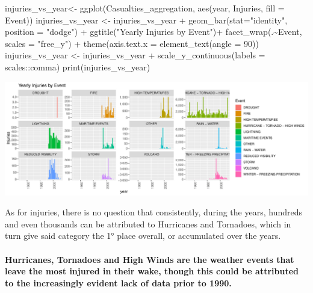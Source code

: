 \documentclass[
]{article}
\newenvironment{Shaded}{\begin{snugshade}}{\end{snugshade}}
\newcommand{\AttributeTok}[1]{\textcolor[rgb]{0.77,0.63,0.00}{#1}}
\newcommand{\DecValTok}[1]{\textcolor[rgb]{0.00,0.00,0.81}{#1}}
\newcommand{\FunctionTok}[1]{\textcolor[rgb]{0.00,0.00,0.00}{#1}}
\newcommand{\NormalTok}[1]{#1}
\newcommand{\OtherTok}[1]{\textcolor[rgb]{0.56,0.35,0.01}{#1}}
\newcommand{\SpecialCharTok}[1]{\textcolor[rgb]{0.00,0.00,0.00}{#1}}
\newcommand{\StringTok}[1]{\textcolor[rgb]{0.31,0.60,0.02}{#1}}
\begin{document}
\begin{Shaded}
\begin{Highlighting}[]
\NormalTok{injuries\_vs\_year}\OtherTok{\textless{}{-}} \FunctionTok{ggplot}\NormalTok{(Casualties\_aggregation, }\FunctionTok{aes}\NormalTok{(year, Injuries, }\AttributeTok{fill =}\NormalTok{ Event))}
\NormalTok{injuries\_vs\_year }\OtherTok{\textless{}{-}}\NormalTok{ injuries\_vs\_year }\SpecialCharTok{+} \FunctionTok{geom\_bar}\NormalTok{(}\AttributeTok{stat=}\StringTok{"identity"}\NormalTok{, }\AttributeTok{position =} \StringTok{"dodge"}\NormalTok{) }\SpecialCharTok{+} \FunctionTok{ggtitle}\NormalTok{(}\StringTok{"Yearly Injuries by Event"}\NormalTok{)}\SpecialCharTok{+} \FunctionTok{facet\_wrap}\NormalTok{(.}\SpecialCharTok{\textasciitilde{}}\NormalTok{Event, }\AttributeTok{scales =} \StringTok{"free\_y"}\NormalTok{) }\SpecialCharTok{+} \FunctionTok{theme}\NormalTok{(}\AttributeTok{axis.text.x =} \FunctionTok{element\_text}\NormalTok{(}\AttributeTok{angle =} \DecValTok{90}\NormalTok{))}
\NormalTok{injuries\_vs\_year }\OtherTok{\textless{}{-}}\NormalTok{ injuries\_vs\_year  }\SpecialCharTok{+} \FunctionTok{scale\_y\_continuous}\NormalTok{(}\AttributeTok{labels =}\NormalTok{ scales}\SpecialCharTok{::}\NormalTok{comma)}
\FunctionTok{print}\NormalTok{(injuries\_vs\_year)}
\end{Highlighting}
\end{Shaded}

\includegraphics{RepData_PeerAssessment2_files/figure-latex/Injuries Results-2.pdf}

As for injuries, there is no question that consistently, during the
years, hundreds and even thousands can be attributed to Hurricanes and
Tornadoes, which in turn give said category the 1° place overall, or
accumulated over the years.

\hypertarget{hurricanes-tornadoes-and-high-winds-are-the-weather-events-that-leave-the-most-injured-in-their-wake-though-this-could-be-attributed-to-the-increasingly-evident-lack-of-data-prior-to-1990.}{%
\paragraph{Hurricanes, Tornadoes and High Winds are the weather events
that leave the most injured in their wake, though this could be
attributed to the increasingly evident lack of data prior to
1990.}\label{hurricanes-tornadoes-and-high-winds-are-the-weather-events-that-leave-the-most-injured-in-their-wake-though-this-could-be-attributed-to-the-increasingly-evident-lack-of-data-prior-to-1990.}}
\end{document}
